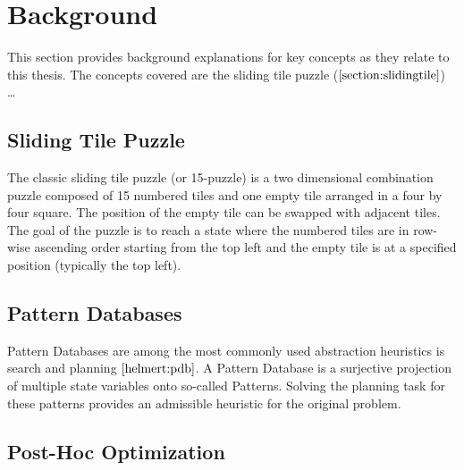 \chapter{Background}

This section provides background explanations for key concepts as they relate to this thesis. The concepts covered are the sliding tile 
puzzle ($\ref{section:slidingtile}$) \dots

\section{Sliding Tile Puzzle} \label{section:slidingtile}

The classic sliding tile puzzle (or 15-puzzle) is a two dimensional combination puzzle composed of 15 numbered tiles and one empty tile arranged in a 
four by four square. The position of the empty tile can be swapped with adjacent tiles. The goal of the puzzle is to reach a state where the 
numbered tiles are in row-wise ascending order starting from the top left and the empty tile is at a specified position (typically the top left).


\section{Pattern Databases}

Pattern Databases are among the most commonly used abstraction heuristics is search and planning $\cite{helmert:pdb}$. A Pattern Database is a surjective projection of multiple state variables onto so-called Patterns. Solving the planning task for these patterns provides an admissible heuristic for the original problem. 

\section{Post-Hoc Optimization}

